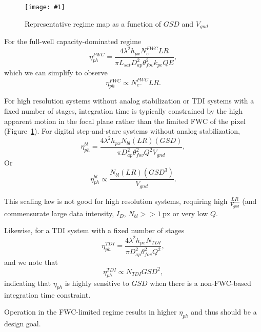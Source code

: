 \documentclass[]{spieman}  %
\newcommand{\includefigure}[3]
{
  \begin{figure}[h!tb]
  \centering
  \texttt{[image: \#1]}
  \caption[]{#3}
  \label{#2}
  \end{figure}
}
\begin{document}
\includefigure{figures/blur_fwc_regime.pgf}{fig:eta_regime}{Representative regime map as a function of $GSD$ and $V_{gnd}$}

For the full-well capacity-dominated regime
\begin{equation}
    \label{eq:eta_ph_fwc}
    \eta_{ph}^{FWC} = \frac{4\lambda^2 h_{px} N_{e^-}^{FWC} LR}{\pi L_{sat} D_{ap}^2 \theta_{fov}^2 k_{pe}QE},
\end{equation}
which we can simplify to observe
\begin{equation}
    \label{eq:eta_fwc_scaling}
    \eta_{ph}^{FWC} \propto N_{e^-}^{FWC} LR.
\end{equation}

For high resolution systems without analog stabilization or TDI systems with a fixed number of stages, integration time is typically constrained by the high apparent motion in the focal plane rather than the limited FWC of the pixel (Figure~\ref{fig:eta_regime}).  For digital step-and-stare systems without analog stabilization,
\begin{equation}
    \label{eq:eta_ph_blur}
    \eta_{ph}^{bl} = \frac{4\lambda^2 h_{px}N_{bl}(LR)(GSD)}{\pi D_{ap}^2\theta_{fov}^2 Q^2 V_{gnd}},
\end{equation}
Or 
\begin{equation}
    \label{eq:eta_blur_scaling}
    \eta_{ph}^{bl} \propto  \frac{N_{bl} (LR) (GSD^3)}{V_{gnd}}.
\end{equation}

This scaling law is not good for high resolution systems, requiring high $\frac{LR}{V_{gnd}}$ (and commensurate large data intensity, $I_{D}$, $N_{bl} >> 1 \: \textrm{px}$ or very low $Q$.

Likewise, for a TDI system with a fixed number of stages
\begin{equation}
    \eta_{ph}^{TDI} = \frac{4\lambda^2 h_{px} N_{TDI}}{\pi D_{ap}^2 \theta_{fov}^2 Q^2},
\end{equation}
and we note that 
\begin{equation}
    \label{eq:eta_ph_tdi_scaling}
    \eta_{ph}^{TDI} \propto N_{TDI} GSD^2,
\end{equation}
indicating that $\eta_{ph}$ is highly sensitive to $GSD$ when there is a non-FWC-based integration time constraint.

\begin{observation}
Operation in the FWC-limited regime results in higher $\eta_{ph}$ and thus should be a design goal.
\end{observation}
\end{document}
